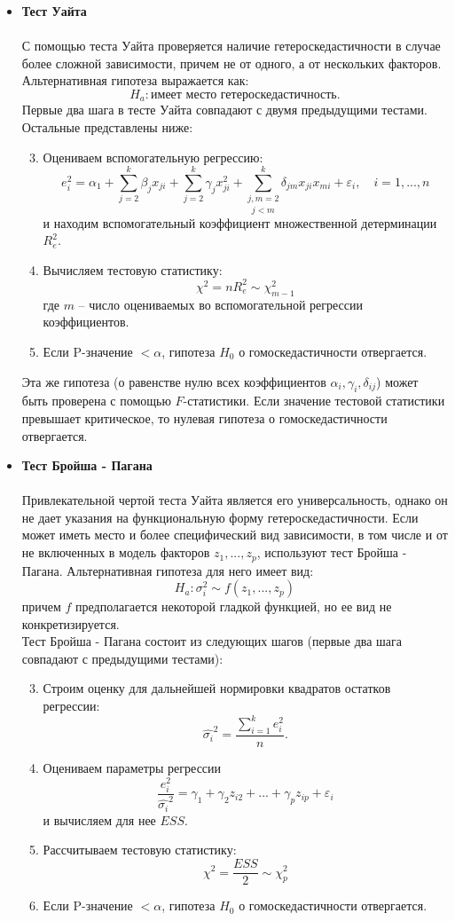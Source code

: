 \documentclass[a0,final]{a0poster}
\begin{document}
\begin{multicols}{4}
\begin{itemize}
\item \textbf{Тест Уайта}\\
\\
С помощью теста Уайта проверяется наличие гетероскедастичности в случае более сложной зависимости, причем не от одного, а от нескольких факторов. Альтернативная гипотеза выражается как: $$H_a: \text{имеет место гетероскедастичность}.$$
Первые два шага в тесте Уайта совпадают с двумя предыдущими тестами. Остальные представлены ниже:
\begin{enumerate}
\setcounter{enumi}{2}
\item Оцениваем вспомогательную регрессию: $$e_i^2 = \alpha_1 + \sum\limits_{j=2}^k {\beta_jx_{ji}} + \sum\limits_{j=2}^k {\gamma_{j}x_{ji}^2} + \underset{j < m}{\sum\limits_{j, m = 2}^k} {\delta_{jm}x_{ji}x_{mi}} + \varepsilon_i, \quad i=1, ... ,n$$ и находим вспомогательный коэффициент множественной детерминации $R^2_e$.
\columnbreak

\item Вычисляем тестовую статистику:  $$\chi^2 = nR^2_e \sim \chi^2_{m-1}$$
где $m$ -- число оцениваемых во вспомогательной регрессии коэффициентов.
\item Если P-значение $< \alpha$, гипотеза $H_0$ о гомоскедастичности отвергается.
\end{enumerate}
Эта же гипотеза (о равенстве нулю всех коэффициентов $\alpha_i, \gamma_i, \delta_{ij}$) может быть проверена с помощью $F$-статистики. Если значение тестовой статистики превышает критическое, то нулевая гипотеза о гомоскедастичности отвергается.\\

\item \textbf{Тест Бройша - Пагана}\\
\\
Привлекательной чертой теста Уайта является его универсальность, однако он не дает указания на функциональную форму гетероскедастичности. Если может иметь место и более специфический вид зависимости, в том числе и от не включенных в модель факторов $z_1, ..., z_p$, используют тест Бройша - Пагана. Альтернативная гипотеза для него имеет вид: $$H_a: \sigma_i^2 \sim f(z_1,...,z_p)$$ причем $f$ предполагается некоторой гладкой функцией, но ее вид не конкретизируется.\\
Тест Бройша - Пагана состоит из следующих шагов (первые два шага совпадают с предыдущими тестами):
\begin{enumerate}
\setcounter{enumi}{2}
\item Строим оценку для дальнейшей нормировки квадратов остатков регрессии: $$\hat{\sigma_i}^2 = \frac{\sum\limits_{i = 1}^k{e^2_i}}{n}.$$
\item Оцениваем параметры регрессии $$\frac{e_i^2}{\hat{\sigma_i}^2} = \gamma_1 + \gamma_2 z_{i2} + ... +\gamma_p z_{ip} + \varepsilon_i$$ и вычисляем для нее $ESS$.
\item Рассчитываем тестовую статистику: $$\chi^2 = \frac{ESS}{2} \sim \chi^2_p$$
\item Если P-значение $< \alpha$, гипотеза $H_0$ о гомоскедастичности отвергается.
\end{enumerate}


\end{itemize}
\end{multicols}
\end{document}
